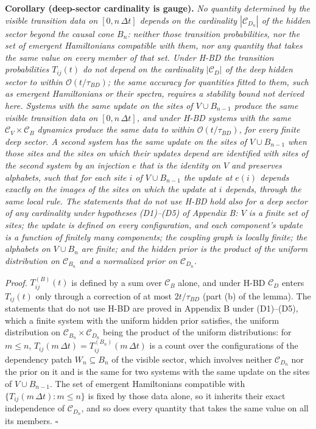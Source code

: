 \documentclass[
]{article}
\begin{document}
\textbf{Corollary (deep-sector cardinality is gauge).} \emph{No quantity
determined by the visible transition data on \([0, n\,\Delta t]\)
depends on the cardinality \(|\mathcal{C}_{D_n}|\) of the hidden sector
beyond the causal cone \(B_n\): neither those transition probabilities,
nor the set of emergent Hamiltonians compatible with them, nor any
quantity that takes the same value on every member of that set. Under
H-BD the transition probabilities \(T_{ij}(t)\) do not depend on the
cardinality \(|\mathcal{C}_D|\) of the deep hidden sector to within
\(\mathcal{O}(t/\tau_{BD})\); the same accuracy for quantities fitted to
them, such as emergent Hamiltonians or their spectra, requires a
stability bound not derived here. Systems with the same update on the
sites of \(V \cup B_{n-1}\) produce the same visible transition data on
\([0, n\,\Delta t]\), and under H-BD systems with the same
\(\mathcal{C}_V \times \mathcal{C}_B\) dynamics produce the same data to
within \(\mathcal{O}(t/\tau_{BD})\), for every finite deep sector. A
second system has the same update on the sites of \(V \cup B_{n-1}\)
when those sites and the sites on which their updates depend are
identified with sites of the second system by an injection \(e\) that is
the identity on \(V\) and preserves alphabets, such that for each site
\(i\) of \(V \cup B_{n-1}\) the update at \(e(i)\) depends exactly on
the images of the sites on which the update at \(i\) depends, through
the same local rule. The statements that do not use H-BD hold also for a
deep sector of any cardinality under hypotheses (D1)--(D5) of Appendix
B: \(V\) is a finite set of sites; the update is defined on every
configuration, and each component's update is a function of finitely
many components; the coupling graph is locally finite; the alphabets on
\(V \cup B_n\) are finite; and the hidden prior is the product of the
uniform distribution on \(\mathcal{C}_{B_n}\) and a normalized prior on
\(\mathcal{C}_{D_n}\).}

\emph{Proof.} \(T^{(B)}_{ij}(t)\) is defined by a sum over
\(\mathcal{C}_B\) alone, and under H-BD \(\mathcal{C}_D\) enters
\(T_{ij}(t)\) only through a correction of at most \(2t/\tau_{BD}\)
(part (b) of the lemma). The statements that do not use H-BD are proved
in Appendix B under (D1)--(D5), which a finite system with the uniform
hidden prior satisfies, the uniform distribution on
\(\mathcal{C}_{B_n} \times \mathcal{C}_{D_n}\) being the product of the
uniform distributions: for \(m \leq n\),
\(T_{ij}(m\,\Delta t) = T^{(B_n)}_{ij}(m\,\Delta t)\) is a count over
the configurations of the dependency patch \(W_n \subseteq B_n\) of the
visible sector, which involves neither \(\mathcal{C}_{D_n}\) nor the
prior on it and is the same for two systems with the same update on the
sites of \(V \cup B_{n-1}\). The set of emergent Hamiltonians compatible
with \(\{T_{ij}(m\,\Delta t) : m \leq n\}\) is fixed by those data
alone, so it inherits their exact independence of \(\mathcal{C}_{D_n}\),
and so does every quantity that takes the same value on all its members.
\(\square\)
\end{document}
